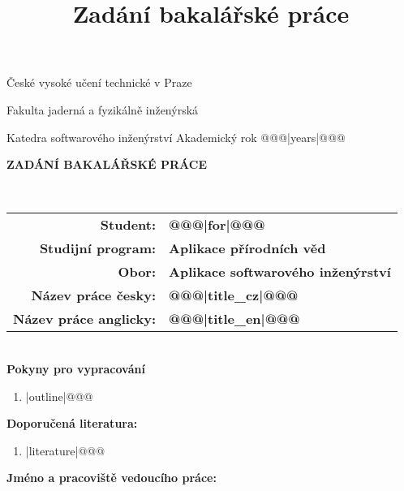 \documentclass[a4paper,11pt,twoside,final]{article}
\title{Zadání bakalářské práce}
\begin{document}
\begin{titlepage}

\begin{center}
  \begin{huge}
		České vysoké učení technické v Praze\par
		Fakulta jaderná a fyzikálně inženýrská
  \end{huge}
\end{center}

\vspace{5mm}
Katedra softwarového inženýrství \hfill     Akademický rok @@@|years|@@@\\[2cm]

\begin{center}
  \begin{huge}
    \textbf{ZADÁNÍ BAKALÁŘSKÉ PRÁCE}
  \end{huge}
\\[2cm]
\end{center}


\begin{tabularx}{\textwidth}{rl}
\textbf{Student:} & \textbf{@@@|for|@@@}\\[0.3cm]
\textbf{Studijní program:} & \textbf{Aplikace přírodních věd}\\[0.3cm]
\textbf{Obor:} & \textbf{Aplikace softwarového inženýrství}\\[0.3cm]
\textbf{Název práce česky:} & \textbf{@@@|title_cz|@@@}\\[0.3cm]
\textbf{Název práce anglicky:} & \textbf{@@@|title_en|@@@}
\end{tabularx}
\\[4cm]

\textbf{Pokyny pro vypracování}

\vspace{5pt}
\begin{enumerate}
@@@\item |outline|@@@
\end{enumerate}

\newpage
\pagestyle{empty}

\textbf{Doporučená literatura:}

\leftmargini=13pt
\begin{enumerate}[label=\lbrack\arabic*\rbrack]
@@@\item |literature|@@@
\end{enumerate}

\vfill
\textbf{Jméno a pracoviště vedoucího práce:}


\end{titlepage}
\end{document}
